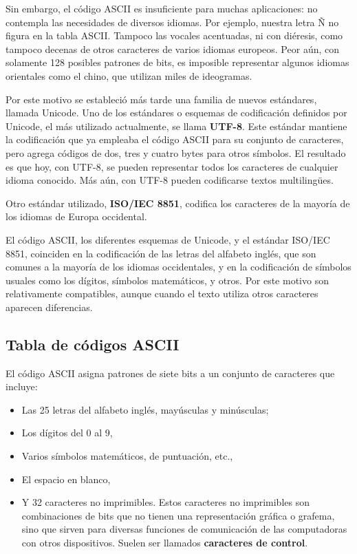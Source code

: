 \documentclass[spanish,A4,]{article}
\begin{document}
Sin embargo, el código ASCII es insuficiente para muchas aplicaciones:
no contempla las necesidades de diversos idiomas. Por ejemplo, nuestra
letra Ñ no figura en la tabla ASCII. Tampoco las vocales acentuadas, ni
con diéresis, como tampoco decenas de otros caracteres de varios idiomas
europeos. Peor aún, con solamente 128 posibles patrones de bits, es
imposible representar algunos idiomas orientales como el chino, que
utilizan miles de ideogramas.

Por este motivo se estableció más tarde una familia de nuevos
estándares, llamada Unicode. Uno de los estándares o esquemas de
codificación definidos por Unicode, el más utilizado actualmente, se
llama \textbf{UTF-8}. Este estándar mantiene la codificación que ya
empleaba el código ASCII para su conjunto de caracteres, pero agrega
códigos de dos, tres y cuatro bytes para otros símbolos. El resultado es
que hoy, con UTF-8, se pueden representar todos los caracteres de
cualquier idioma conocido. Más aún, con UTF-8 pueden codificarse textos
multilingües.

Otro estándar utilizado, \textbf{ISO/IEC 8851}, codifica los caracteres
de la mayoría de los idiomas de Europa occidental.

El código ASCII, los diferentes esquemas de Unicode, y el estándar
ISO/IEC 8851, coinciden en la codificación de las letras del alfabeto
inglés, que son comunes a la mayoría de los idiomas occidentales, y en
la codificación de símbolos usuales como los dígitos, símbolos
matemáticos, y otros. Por este motivo son relativamente compatibles,
aunque cuando el texto utiliza otros caracteres aparecen diferencias.

\subsection{Tabla de códigos ASCII}\label{tabla-de-cuxf3digos-ascii}

El código ASCII asigna patrones de siete bits a un conjunto de
caracteres que incluye:

\begin{itemize}
\itemsep1pt\parskip0pt
\item
  Las 25 letras del alfabeto inglés, mayúsculas y minúsculas;
\item
  Los dígitos del 0 al 9,
\item
  Varios símbolos matemáticos, de puntuación, etc.,
\item
  El espacio en blanco,
\item
  Y 32 caracteres no imprimibles. Estos caracteres no imprimibles son
  combinaciones de bits que no tienen una representación gráfica o
  grafema, sino que sirven para diversas funciones de comunicación de
  las computadoras con otros dispositivos. Suelen ser llamados
  \textbf{caracteres de control}.
\end{itemize}
\end{document}
